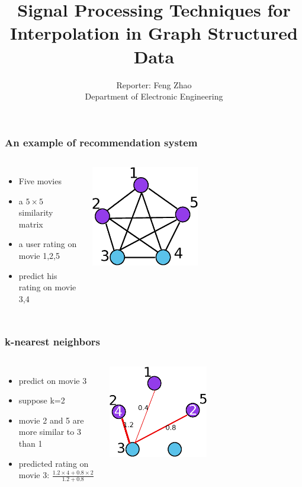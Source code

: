 \documentclass{beamer}
\title{Signal Processing Techniques for Interpolation in Graph Structured Data}
\author{Reporter: Feng Zhao\\Department of Electronic Engineering}
\begin{document}
\begin{frame}
\titlepage
\end{frame}
\begin{frame}
\frametitle{An example of recommendation system}
\begin{columns}
\begin{itemize}
\item Five movies
\item a $5\times 5$ similarity matrix
\item a user rating on movie 1,2,5
\item predict his rating on movie 3,4 
\end{itemize}
\includegraphics[width=0.5\textwidth]{movie5.eps}
\end{columns}
\end{frame}

\begin{frame}
\frametitle{k-nearest neighbors}
\begin{columns}
\begin{itemize}
\item predict on movie 3
\item suppose k=2
\item movie 2 and 5 are more similar to 3 than 1
\item predicted rating on movie 3: $\frac{1.2\times 4+0.8\times 2}{1.2+0.8}$
\end{itemize}
\includegraphics[width=0.5\textwidth]{movie5_knn.eps}
\end{columns}
\end{frame}
\end{document}
